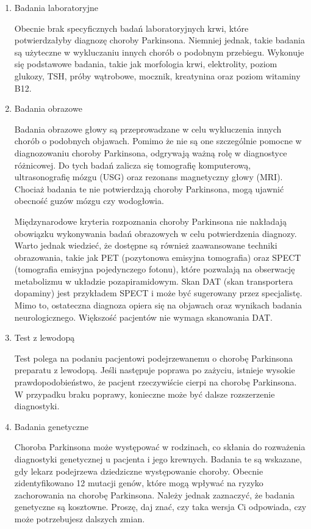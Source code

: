 \renewcommand{\labelenumi}{\alph{enumi})}
\begin{enumerate}
	\item Badania laboratoryjne

Obecnie brak specyficznych badań laboratoryjnych krwi, które potwierdzałyby diagnozę choroby Parkinsona.
Niemniej jednak, takie badania są użyteczne w wykluczaniu innych chorób o podobnym przebiegu.
Wykonuje się podstawowe badania, takie jak morfologia krwi, elektrolity, poziom glukozy, TSH, próby wątrobowe, mocznik, kreatynina oraz poziom witaminy B12.

	\item Badania obrazowe

Badania obrazowe głowy są przeprowadzane w celu wykluczenia innych chorób o podobnych objawach. Pomimo że nie są one szczególnie pomocne w diagnozowaniu choroby Parkinsona, odgrywają ważną rolę w diagnostyce różnicowej. Do tych badań zalicza się tomografię komputerową, ultrasonografię mózgu (USG) oraz rezonans magnetyczny głowy (MRI). Chociaż badania te nie potwierdzają choroby Parkinsona, mogą ujawnić obecność guzów mózgu czy wodogłowia.

Międzynarodowe kryteria rozpoznania choroby Parkinsona nie nakładają obowiązku wykonywania badań obrazowych w celu potwierdzenia diagnozy.
Warto jednak wiedzieć, że dostępne są również zaawansowane techniki obrazowania, takie jak PET (pozytonowa emisyjna tomografia) oraz SPECT (tomografia emisyjna pojedynczego fotonu), które pozwalają na obserwację metabolizmu w układzie pozapiramidowym. Skan DAT (skan transportera dopaminy) jest przykładem SPECT i może być sugerowany przez specjalistę.
Mimo to, ostateczna diagnoza opiera się na objawach oraz wynikach badania neurologicznego. Większość pacjentów nie wymaga skanowania DAT.


	\item Test z lewodopą

Test polega na podaniu pacjentowi podejrzewanemu o chorobę Parkinsona preparatu z lewodopą.
Jeśli następuje poprawa po zażyciu, istnieje wysokie prawdopodobieństwo, że pacjent rzeczywiście cierpi na chorobę Parkinsona.
W przypadku braku poprawy, konieczne może być dalsze rozszerzenie diagnostyki.

	\item Badania genetyczne

Choroba Parkinsona może występować w rodzinach, co skłania do rozważenia diagnostyki genetycznej u pacjenta i jego krewnych.
Badania te są wskazane, gdy lekarz podejrzewa dziedziczne występowanie choroby.
Obecnie zidentyfikowano 12 mutacji genów, które mogą wpływać na ryzyko zachorowania na chorobę Parkinsona.
Należy jednak zaznaczyć, że badania genetyczne są kosztowne.
Proszę, daj znać, czy taka wersja Ci odpowiada, czy może potrzebujesz dalszych zmian.



\end{enumerate}
